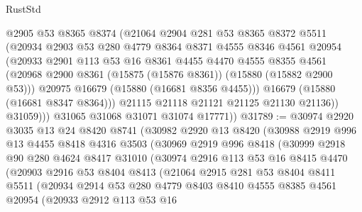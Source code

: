 \begin{lexlean}{RustStd}
\begin{coremodule}
                @2905
                @53
                @8365
                @8374
                (@21064
                  @2904
                  @281
                  @53
                  @8365
                  @8372
                  @5511
                  (@20934
                    @2903
                    @53
                    @280
                    @4779
                    @8364
                    @8371
                    @4555
                    @8346
                    @4561
                    @20954
                    (@20933
                      @2901
                      @113
                      @53
                      @16
                      @8361
                      @4455
                      @4470
                      @4555
                      @8355
                      @4561
                      (@20968 @2900 @8361 (@15875 (@15876 @8361)) (@15880 (@15882 @2900 @53)))
                      @20975
                      @16679
                      (@15880 (@16681 @8356 @4455)))
                    @16679
                    (@15880 (@16681 @8347 @8364)))
                  @21115
                  @21118
                  @21121
                  @21125
                  @21130
                  @21136))
              @31059)))
        @31065
        @31068
        @31071
        @31074
        @17771))
@31789 := @30974
    @2920
    @3035
    @13
    @24
    @8420
    @8741
    (@30982
      @2920
      @13
      @8420
      (@30988
        @2919
        @996
        @13
        @4455
        @8418
        @4316
        @3503
        (@30969
          @2919
          @996
          @8418
          (@30999
            @2918
            @90
            @280
            @4624
            @8417
            @31010
            (@30974
              @2916
              @113
              @53
              @16
              @8415
              @4470
              (@20903
                @2916
                @53
                @8404
                @8413
                (@21064
                  @2915
                  @281
                  @53
                  @8404
                  @8411
                  @5511
                  (@20934
                    @2914
                    @53
                    @280
                    @4779
                    @8403
                    @8410
                    @4555
                    @8385
                    @4561
                    @20954
                    (@20933
                      @2912
                      @113
                      @53
                      @16

\end{coremodule}
\end{lexlean}
